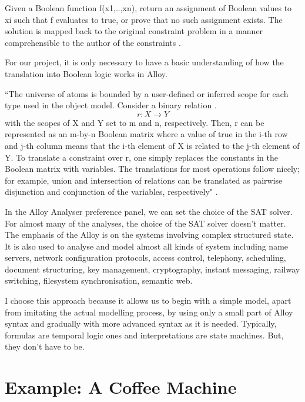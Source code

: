 \documentclass[a4paper,10pt]{report}
\begin{document}
Given a Boolean function f(x1,..,xn), return an assignment of Boolean values to xi such that f evaluates to true, or prove that no such assignment exists. The solution is mapped back to the original constraint problem in a manner comprehensible to the author of the constraints \cite{Yeung2005}.

For our project, it is only necessary to have a basic understanding of how the translation into Boolean logic works in Alloy. 
 
``The universe of atoms is bounded by a user-defined or inferred scope for each type used in the object model. Consider a binary relation .
\begin{equation}
r : X \rightarrow Y
\end{equation} with the scopes of X and Y set to m and n, respectively. Then, r can be represented as an m-by-n Boolean matrix where a value of true in the i-th row and j-th column means that the i-th element of X is related to the j-th element of Y. To translate a constraint over r, one simply replaces the constants in the Boolean matrix with variables. The translations for most operations follow nicely; for example, union and intersection of relations can be translated as pairwise disjunction and conjunction of the variables, respectively" \cite{Yeung2005}.

In the Alloy Analyser preference panel, we can set the choice of the SAT solver. For almost many of the analyses, the choice of the SAT solver doesn't matter. The emphasis of the Alloy is on the systems involving complex structured state. It is also used to analyse and model almost all kinds of system including name servers, network configuration protocols, access control, telephony, scheduling, document structuring, key management, cryptography, instant messaging, railway switching, filesystem synchronisation, semantic web. 

I choose this approach because it allows us to begin with a simple model, apart from imitating the actual modelling process, by using only a small part of Alloy syntax and gradually with more advanced syntax as it is needed. Typically, formulas are temporal logic ones and interpretations are state machines. But, they don't have to be.

\section{Example: A Coffee Machine} \cite{Boyatt}
\label{Ex: Coffee machine}
\end{document}
